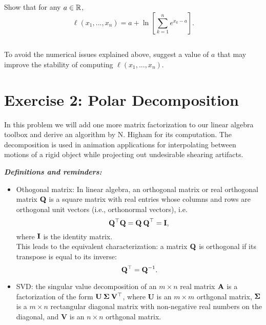 \subsection{} Show that for any $a \in \mathbb{R}$,
\begin{equation*}
\ell(x_1,...,x_n) = a + \ln\left[\sum_{k=1}^n e^{x_k-a}\right].
\end{equation*}
\vspace{15cm}

\subsection{} To avoid the numerical issues explained above, suggest a value of $a$ that may improve the stability of computing $\ell(x_1,...,x_n)$.
\pagebreak





\section{Exercise 2: Polar Decomposition}

In this problem we will add one more matrix factorization to our linear algebra toolbox and derive an algorithm by N. Higham for its computation.  The decomposition  is  used  in  animation  applications for interpolating  between  motions  of  a  rigid  object while projecting out undesirable shearing artifacts.

{\it\textbf{Definitions and reminders:}
\begin{itemize}
\item Othogonal matrix: In linear algebra, an orthogonal matrix or real orthogonal matrix ${\bf Q}$ is a square matrix with real entries whose columns and rows are orthogonal unit vectors (i.e., orthonormal vectors), i.e.
    $${\bf Q}^\top {\bf Q} = {\bf Q \: Q}^\top = {\bf I},$$
where ${\bf I}$ is the identity matrix.\\
This leads to the equivalent characterization: a matrix ${\bf Q}$ is orthogonal if its transpose is equal to its inverse:
    $${\bf Q}^\top = {\bf Q}^{-1}.$$
\item SVD: the singular value decomposition of an $m \times n$ real matrix ${\bf A}$ is a factorization of the form  ${\bf U \: \Sigma \: V^\top}$, where {\bf U} is an $m \times m$ orthgonal matrix, ${\bf \Sigma}$ is a $m \times n$ rectangular diagonal matrix with non-negative real numbers on the diagonal, and {\bf V} is an $n \times n$ orthgonal matrix.
\end{itemize}
}
